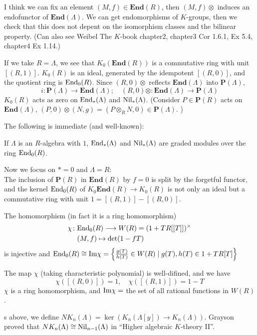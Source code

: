 I think we can fix an element $(M,f)\in \mathbf{End}(R)$, then $(M,f)\otimes$ induces an endofunctor of $\mathbf{End}(\Lambda)$. We can get endomorphisms of $K$-groups, then we check that this does not depent on the isomorphism classes and the bilinear property. (Can also see Weibel The $K$-book chapter2, chapter3 Cor 1.6.1, Ex 5.4, chapter4 Ex 1.14.)

If we take $R = \Lambda$, we see that $K_0(\mathbf{End}(R))$ is a commutative ring with unit $[(R,1)]$. $K_0(R)$ is an
ideal, generated by the idempotent $[(R,0)]$, and the quotient
ring is $\mathrm{End}_0(R)$.  Since $(R,0)\otimes$ reflects $\mathbf{End} (\Lambda)$ into $\mathbf{P} (\Lambda)$,
\[i\colon \mathbf{P} (\Lambda) \longrightarrow \mathbf{End} (\Lambda);\quad
 (R,0)\otimes\colon \mathbf{End} (\Lambda) \longrightarrow \mathbf{P} (\Lambda)\]
$K_0(R)$ acts as zero on $\mathrm{End}_*(\Lambda)$ and $\mathrm{Nil}_*(\Lambda)$. (Consider $P\in \mathbf{P}(R)$ acts on $\mathbf{End}(\Lambda)$, $(P,0)\otimes (N,g)=(P\otimes_R N,0) \in \mathbf{P}(\Lambda)$. )

The following is immediate (and well-known):
\begin{prop}
	If  $\Lambda$ is an $R$-algebra with $1$, $\mathrm{End}_*(\Lambda)$ and
$\mathrm{Nil}_*(\Lambda)$ are graded modules over the ring $\mathrm{End}_0 (R)$.
\end{prop}
Now we focus on $*=0$ and $\Lambda =R$:\\

The inclusion of $\mathbf{P}(R)$ in $\mathbf{End}(R)$ by $f = 0$ is split by the forgetful functor, and the kernel $\mathrm{End}_0 (R)$ of $K_0\mathbf{End}(R) \longrightarrow K_0 (R)$ is not only an ideal but a commutative ring with unit $1 = [(R,1)] - [(R, 0)]$.

\begin{theorem}[Almkvist]
The homomorphism (in fact it is a ring homomorphism)
\begin{align*}
	\chi \colon&  \mathrm{End}_0(R)\longrightarrow W(R)=(1+TR[[T]])^{\times}\\
     & (M,f) \mapsto \det(1-fT)
\end{align*}
	is injective and $\mathrm{End}_0(R)\cong \mathrm{Im} \chi =\left\{\frac{g(T)}{h(T)}\in W(R)\mid g(T),h(T) \in 1+TR[T]\right\}$
\end{theorem}
The map $\chi$ (taking characteristic polynomial) is well-difined, and we have 
\[\chi([(R,0)])=1, \quad \chi([(R,1)])=1-T\]
$\chi$ is a ring homomorphism, and $\mathrm{Im} \chi =$ the set of all rational functions in $W(R)$.

\begin{definition}[$NK_*$]
	s above, we define $NK_n(\Lambda)=\ker(K_n(\Lambda[y])\longrightarrow K_n(\Lambda))$. Grayson proved that $NK_n(\Lambda)\cong \mathrm{Nil}_{n-1}(\Lambda)$ in ``Higher algebraic $K$-theory II''.
\end{definition}

